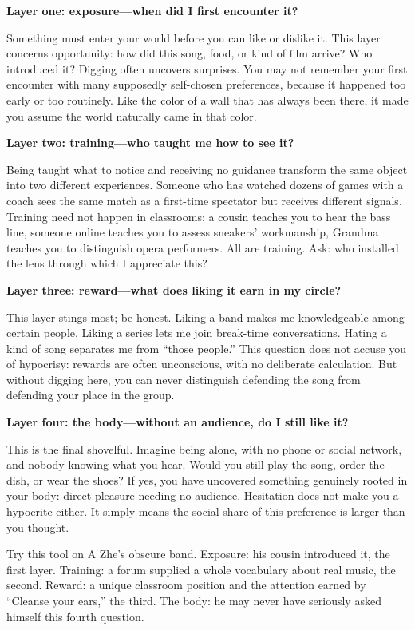 \textbf{Layer one: exposure---when did I first encounter it?}

Something must enter your world before you can like or dislike it. This layer concerns opportunity: how did this song, food, or kind of film arrive? Who introduced it? Digging often uncovers surprises. You may not remember your first encounter with many supposedly self-chosen preferences, because it happened too early or too routinely. Like the color of a wall that has always been there, it made you assume the world naturally came in that color.

\textbf{Layer two: training---who taught me how to see it?}

Being taught what to notice and receiving no guidance transform the same object into two different experiences. Someone who has watched dozens of games with a coach sees the same match as a first-time spectator but receives different signals. Training need not happen in classrooms: a cousin teaches you to hear the bass line, someone online teaches you to assess sneakers' workmanship, Grandma teaches you to distinguish opera performers. All are training. Ask: who installed the lens through which I appreciate this?

\textbf{Layer three: reward---what does liking it earn in my circle?}

This layer stings most; be honest. Liking a band makes me knowledgeable among certain people. Liking a series lets me join break-time conversations. Hating a kind of song separates me from ``those people.'' This question does not accuse you of hypocrisy: rewards are often unconscious, with no deliberate calculation. But without digging here, you can never distinguish defending the song from defending your place in the group.

\textbf{Layer four: the body---without an audience, do I still like it?}

This is the final shovelful. Imagine being alone, with no phone or social network, and nobody knowing what you hear. Would you still play the song, order the dish, or wear the shoes? If yes, you have uncovered something genuinely rooted in your body: direct pleasure needing no audience. Hesitation does not make you a hypocrite either. It simply means the social share of this preference is larger than you thought.

Try this tool on A Zhe's obscure band. Exposure: his cousin introduced it, the first layer. Training: a forum supplied a whole vocabulary about real music, the second. Reward: a unique classroom position and the attention earned by ``Cleanse your ears,'' the third. The body: he may never have seriously asked himself this fourth question.

